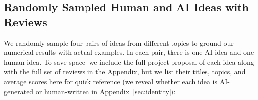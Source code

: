 



\subsection{Randomly Sampled Human and AI Ideas with Reviews}
 
We randomly sample four pairs of ideas from different topics to ground our numerical results with actual examples. 
In each pair, there is one AI idea and one human idea. To save space, we include the full project proposal of each idea along with the full set of reviews in the Appendix, but we list their titles, topics, and average scores here for quick reference (we reveal whether each idea is AI-generated or human-written in Appendix~\ref{sec:identity}):

